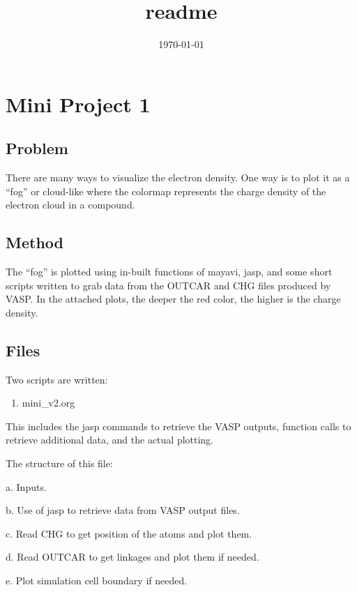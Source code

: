 \documentclass[11pt]{article}
\title{readme}
\author{}
\date{\today}
\begin{document}
\maketitle

\setcounter{tocdepth}{3}
\tableofcontents
\vspace*{1cm}
\section{Mini Project 1}
\label{sec-1}
\subsection{Problem}
\label{sec-1-1}

There are many ways to visualize the electron density.  One way is to plot it as a ``fog'' or cloud-like where the colormap represents the charge density of the electron cloud in a compound.
\subsection{Method}
\label{sec-1-2}

The ``fog'' is plotted using in-built functions of mayavi, jasp, and some short scripts written to grab data from the OUTCAR and CHG files produced by VASP.  In the attached plots, the deeper the red color, the higher is the charge density.
\subsection{Files}
\label{sec-1-3}

Two scripts are written:


\begin{enumerate}
\item mini\_v2.org
\end{enumerate}


This includes the jasp commands to retrieve the VASP outputs, function calls to retrieve additional data, and the actual plotting.


The structure of this file:


a. Inputs.


b. Use of jasp to retrieve data from VASP output files.


c. Read CHG to get position of the atoms and plot them.


d. Read OUTCAR to get linkages and plot them if needed.


e. Plot simulation cell boundary if needed.
\end{document}
